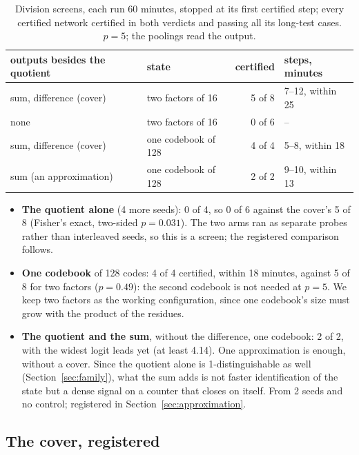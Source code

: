 \documentclass[11pt]{article}
\begin{document}
\begin{table}[t]
\centering
\caption{Division screens, each run 60 minutes, stopped at its first certified step; every certified
network certified in both verdicts and passing all its long-test cases. $p = 5$; the poolings read
the output.}
\label{tab:screens}
\begin{tabular}{llrl}
\toprule
outputs besides the quotient & state & certified & steps, minutes \\
\midrule
sum, difference (cover) & two factors of 16 & 5 of 8 & 7--12, within 25 \\
none & two factors of 16 & 0 of 6 & -- \\
sum, difference (cover) & one codebook of 128 & 4 of 4 & 5--8, within 18 \\
sum (an approximation) & one codebook of 128 & 2 of 2 & 9--10, within 13 \\
\bottomrule
\end{tabular}
\end{table}

\begin{itemize}
\item \textbf{The quotient alone} (4 more seeds): 0 of 4, so 0 of 6 against the cover's 5 of 8
  (Fisher's exact, two-sided $p = 0.031$). The two arms ran as separate probes rather than
  interleaved seeds, so this is a screen; the registered comparison follows.
\item \textbf{One codebook} of 128 codes: 4 of 4 certified, within 18 minutes, against 5 of 8 for two
  factors ($p = 0.49$): the second codebook is not needed at $p = 5$. We keep two factors as the
  working configuration, since one codebook's size must grow with the product of the residues.
\item \textbf{The quotient and the sum}, without the difference, one codebook: 2 of 2, with the
  widest logit leads yet (at least 4.14). One approximation is enough, without a cover. Since the
  quotient alone is 1-distinguishable as well (Section~\ref{sec:family}), what the sum adds is not
  faster identification of the state but a dense signal on a counter that closes on itself. From
  2 seeds and no control; registered in Section~\ref{sec:approximation}.
\end{itemize}

\subsection{The cover, registered}
\label{sec:claim}
\end{document}
